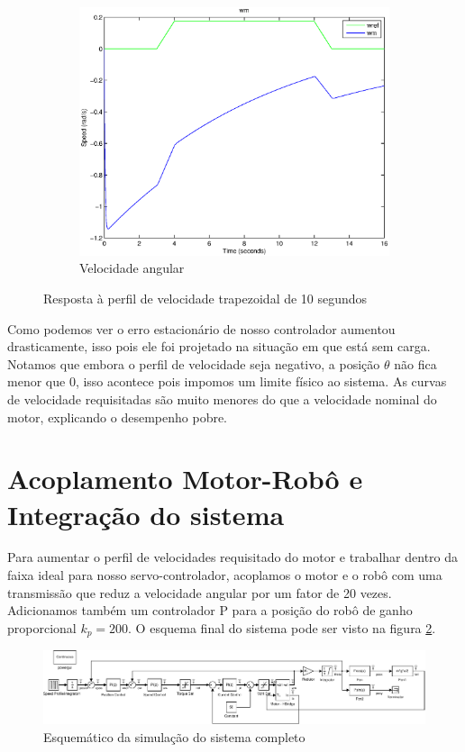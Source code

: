 \documentclass{article}
\begin{document}
\begin{figure}[H]
\begin{subfigure}{0.45\textwidth}
		\includegraphics[width=\linewidth]{matlab/wm9}
		\caption{Velocidade angular}
	\end{subfigure}
	\caption{Resposta à perfil de velocidade trapezoidal de 10 segundos}	
	\label{fig:sim9res}
\end{figure}

Como podemos ver o erro estacionário de nosso controlador aumentou drasticamente, isso pois ele foi projetado na situação em que está sem carga. Notamos que embora o perfil de velocidade seja negativo, a posição $\theta$ não fica menor que $0$, isso acontece pois impomos um limite físico ao sistema. As curvas de velocidade requisitadas são muito menores do que a velocidade nominal do motor, explicando o desempenho pobre.

\section{Acoplamento Motor-Robô e Integração do sistema}
Para aumentar o perfil de velocidades requisitado do motor e trabalhar dentro da faixa ideal para nosso servo-controlador, acoplamos o motor e o robô com uma transmissão que reduz a velocidade angular por um fator de 20 vezes. Adicionamos também um controlador P para a posição do robô de ganho proporcional $k_p = 200$. O esquema final do sistema pode ser visto na figura \ref{fig:sim4}.

\begin{figure}[H]
	\centering
	\includegraphics[width=\linewidth]{matlab/sim4}
	\caption{Esquemático da simulação do sistema completo}
	\label{fig:sim4}
\end{figure}
\end{document}
